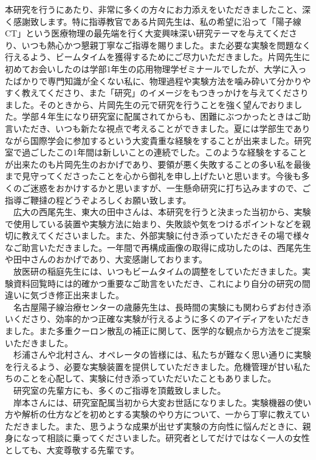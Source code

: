 \begin{acknowledgment}
本研究を行うにあたり、非常に多くの方々にお力添えをいただきましたこと、深く感謝致します。特に指導教官である片岡先生は、私の希望に沿って「陽子線CT」という医療物理の最先端を行く大変興味深い研究テーマを与えてくださり、いつも熱心かつ懇親丁寧なご指導を賜りました。また必要な実験を問題なく行えるよう、ビームタイムを獲得するためにご尽力いただきました。片岡先生に初めてお会いしたのは学部1年生の応用物理学ゼミナールでしたが、大学に入ったばかりで専門知識が全くない私に、物理過程や実験方法を噛み砕いて分かりやすく教えてくださり、また「研究」のイメージをもつきっかけを与えてくださりました。そのときから、片岡先生の元で研究を行うことを強く望んでおりました。学部４年生になり研究室に配属されてからも、困難にぶつかったときはご助言いただき、いつも新たな視点で考えることができました。夏には学部生でありながら国際学会に参加するという大変貴重な経験をすることが出来ました。研究室で過ごしたこの1年間は新しいことの連続でした。このような経験をすることが出来たのも片岡先生のおかげであり、要領が悪く失敗することの多い私を最後まで見守ってくださったことを心から御礼を申し上げたいと思います。今後も多くのご迷惑をおかけするかと思いますが、一生懸命研究に打ち込みますので、ご指導ご鞭撻の程どうぞよろしくお願い致します。\\
　広大の西尾先生、東大の田中さんは、本研究を行うと決まった当初から、実験で使用している装置や実験方法に始まり、失敗談や気をつけるポイントなどを親切に教えてくださいました。また、外部実験に付き添っていただきその場で様々なご助言いただきました。一年間で再構成画像の取得に成功したのは、西尾先生や田中さんのおかげであり、大変感謝しております。\\
　放医研の稲庭先生には、いつもビームタイムの調整をしていただきました。実験資料回覧時には的確かつ重要なご助言をいただき、これにより自分の研究の間違いに気づき修正出来ました。\\
　名古屋陽子線治療センターの歳藤先生は、長時間の実験にも関わらずお付き添いくださり、効率的かつ正確な実験が行えるように多くのアイディアをいただきました。また多重クーロン散乱の補正に関して、医学的な観点から方法をご提案いただきました。\\
　杉浦さんや北村さん、オペレータの皆様には、私たちが難なく思い通りに実験を行えるよう、必要な実験装置を提供していただきました。危機管理が甘い私たちのことを心配して、実験に付き添っていただいたこともありました。\\
　研究室の先輩方にも、多くのご指導を頂戴致しました。\\
　岸本さんには、研究室配属当初から大変お世話になりました。実験機器の使い方や解析の仕方などを初めとする実験のやり方について、一から丁寧に教えていただきました。また、思うような成果が出せず実験の方向性に悩んだときに、親身になって相談に乗ってくださいました。研究者としてだけではなく一人の女性としても、大変尊敬する先輩です。\\

\end{acknowledgment}
